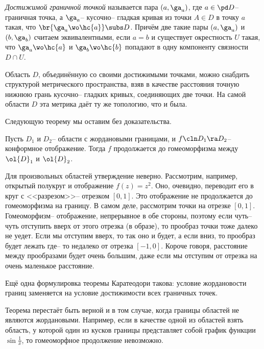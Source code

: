 \documentclass[a4paper]{article}
\begin{document}
\begin{df}
\emph{Достижимой граничной точкой} называется пара $(a,\ga_a)$, где $a\in\pd D$-- граничная точка, а
$\ga_a$-- кусочно-- гладкая кривая из точки $A \in D$ в точку $a$ такая, что $\br{\ga_a \wo \hc{a}}\subs D$.
Причём две такие пары $(a,\ga_a)$ и $(b,\ga_b)$ считаем эквивалентными, если $a=b$
и существует окрестность $U$ такая, что $\ga_a \wo \hc{a}$ и $\ga_b \wo \hc{b}$ попадают в одну компоненту
связности $D\cap U$.
\end{df}

\begin{note}
Область $D$, объединённую со своими достижимыми точками, можно снабдить
структурой метрического пространства, взяв в качестве расстояния точную нижнюю грань
кусочно-- гладких кривых, соединяющих две точки.
На самой области $D$ эта метрика даёт ту же топологию, что и была.
\end{note}

Следующую теорему мы оставим без доказательства.
\begin{theorem}[Каратеодори]
Пусть $D_1$ и $D_2$-- области с жордановыми границами, и
$f\cln D_1\ra D_2$-- конформное отображение. Тогда $f$ продолжается до гомеоморфизма между $\ol{D}_1$ и $\ol{D}_2$.
\end{theorem}

\begin{note}
Для произвольных областей утверждение неверно. Рассмотрим, например, открытый полукруг и отображение $f(z)=z^2$.
Оно, очевидно, переводит его в круг с <<разрезом>>-- отрезком $[0,1]$. Это отображение не продолжается
до гомеоморфизма на границу.
В самом деле, рассмотрим точки на отрезке $[0,1]$. Гомеоморфизм-- отображение, непрерывное
в обе стороны, поэтому если чуть-- чуть отступить вверх от этого отрезка (в образе), то прообраз точки тоже далеко не уедет.
Если мы отступим вверх, то так оно и будет, а если вниз, то прообраз будет лежать где-- то недалеко от отрезка $[-1,0]$.
Короче говоря, расстояние между прообразами будет очень большим, даже если мы отступим от отрезка на очень маленькое
расстояние.
\end{note}

Ещё одна формулировка теоремы Каратеодори такова: условие жордановости
границ заменяется на условие достижимости всех граничных точек.

\begin{note}
Теорема  перестаёт быть верной и в том случае, когда границы областей не являются жордановыми. Например, если в качестве
одной из областей взять область, у которой один из кусков границы представляет собой график функции
$\sin \frac{1}{x}$, то гомеоморфное продолжение невозможно.
\end{note}
\end{document}
